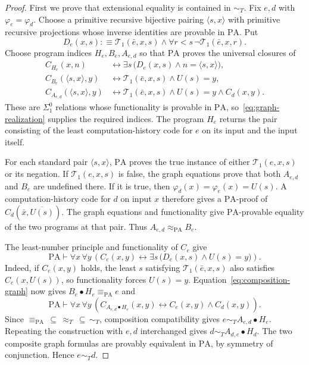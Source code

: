 \documentclass[11pt]{article}
\newcommand{\PA}{\mathrm{PA}}
\begin{document}
\begin{proof}
First we prove that extensional equality is contained in $\sim_T$.
Fix $e,d$ with $\varphi_e=\varphi_d$.
Choose a primitive recursive bijective pairing $\langle s,x\rangle$
with primitive recursive projections whose inverse identities are
provable in $\PA$. Put
\[
 D_e(x,s):\!\equiv
 \mathcal{T}_1(\bar e,x,s)\land\forall r<s\,\neg\mathcal{T}_1(\bar e,x,r).
\]
Choose program indices $H_e,B_e,A_{e,d}$ so that $\PA$ proves the
universal closures of
\begin{align*}
 C_{H_e}(x,n)&\longleftrightarrow
       \exists s\,\bigl(D_e(x,s)\land n=\langle s,x\rangle\bigr),\\
 C_{B_e}(\langle s,x\rangle,y)&\longleftrightarrow
       \mathcal{T}_1(\bar e,x,s)\land U(s)=y,\\
 C_{A_{e,d}}(\langle s,x\rangle,y)&\longleftrightarrow
       \mathcal{T}_1(\bar e,x,s)\land U(s)=y\land C_d(x,y).
\end{align*}
These are $\Sigma^0_1$ relations whose functionality is provable in
$\PA$, so~\eqref{eq:graph-realization} supplies the required indices.
The program $H_e$ returns the pair consisting of the least
computation-history code for $e$ on its input and the input itself.

For each standard pair $\langle s,x\rangle$, $\PA$ proves the true
instance of either $\mathcal{T}_1(e,x,s)$ or its negation. If
$\mathcal{T}_1(e,x,s)$ is false, the graph equations prove that both $A_{e,d}$ and $B_e$
are undefined there. If it is true, then
$\varphi_d(x)=\varphi_e(x)=U(s)$. A computation-history code for
$d$ on input $x$ therefore gives a $\PA$-proof of
$C_d(\bar x,\overline{U(s)})$. The graph equations and functionality
give $\PA$-provable equality of the two programs at that pair.
Thus $A_{e,d}\approx_{\PA}B_e$.

The least-number principle and functionality of $C_e$ give
\[
 \PA\vdash\forall x\,\forall y\,
 \left(C_e(x,y)\longleftrightarrow
       \exists s\,\bigl(D_e(x,s)\land U(s)=y\bigr)\right).
\]
Indeed, if $C_e(x,y)$ holds, the least $s$ satisfying
$\mathcal{T}_1(\bar e,x,s)$ also satisfies $C_e(x,U(s))$, so functionality
forces $U(s)=y$. Equation~\eqref{eq:composition-graph} now gives
$B_e\bullet H_e\equiv_{\PA}e$ and
\[
 \PA\vdash\forall x\,\forall y\,
 \left(C_{A_{e,d}\bullet H_e}(x,y)\longleftrightarrow
             C_e(x,y)\land C_d(x,y)\right).
\]
Since $\equiv_{\PA}\,\subseteq\,\approx_T\,\subseteq\,\sim_T$,
composition compatibility gives
$e\sim_T A_{e,d}\bullet H_e$.
Repeating the construction with $e,d$ interchanged gives
$d\sim_T A_{d,e}\bullet H_d$. The two composite graph formulas are
provably equivalent in $\PA$, by symmetry of conjunction. Hence
$e\sim_Td$.


\end{proof}
\end{document}
